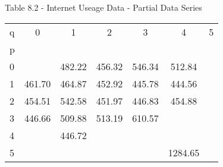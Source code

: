 \documentclass{article}
\begin{document}
\begin{center}
Table 8.2 - Internet Useage Data - Partial Data Series
\end{center}
\begin{center}
\begin{tabular}{ l c c c c c c} 
q & 0 & 1 & 2 & 3 & 4 & 5 \\
p & & & & & & \\
0 &   & 482.22 & 456.32 & 546.34 & 512.84 &   \\
1 & 461.70 & 464.87 & 452.92 & 445.78 & 444.56 &   \\
2 & 454.51 & 542.58 & 451.97 & 446.83 & 454.88 &   \\
3 & 446.66 & 509.88 & 513.19 & 610.57 &   &   \\
4 &   & 446.72 &   &   &   &   \\
5 &   &   &   &   & 1284.65 &  
\end{tabular}
\end{center}
\end{document}
